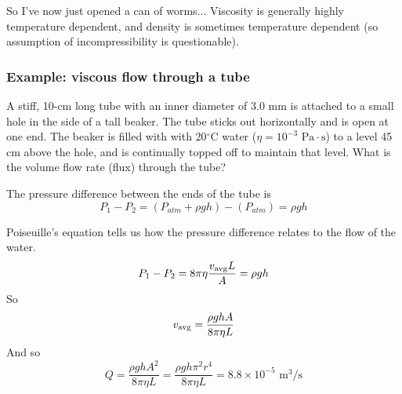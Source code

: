 So I've now just opened a can of worms... Viscosity is generally highly temperature dependent, and density is sometimes temperature dependent (so assumption of incompressibility is questionable).

\subsubsection{Example: viscous flow through a tube}
A stiff, 10-cm long tube with an inner diameter of 3.0 mm is attached to a small hole in the side of a tall beaker. The tube sticks out horizontally and is open at one end. The beaker is filled with with 20$^\circ$C water ($\eta=10^{-3}\mbox{ Pa}\cdot\mbox{s}$) to a level 45 cm above the hole, and is continually topped off to maintain that level. What is the volume flow rate (flux) through the tube?

The pressure difference between the ends of the tube is
$$P_1-P_2=(P_{atm}+\rho gh)-(P_{atm})=\rho gh$$

Poiseuille's equation tells us how the pressure difference relates to the flow of the water.
$$P_1-P_2=8\pi\eta\frac{v_{\rm avg}L}{A}=\rho gh$$
So 
$$v_{\rm avg}=\frac{\rho ghA}{8\pi\eta L}$$
And so
$$Q=\frac{\rho ghA^2}{8\pi\eta L}=\frac{\rho gh\pi^2r^4}{8\pi\eta L}=8.8\times 10^{-5}\mbox{ m}^3/\mbox{s}$$



\clearpage
